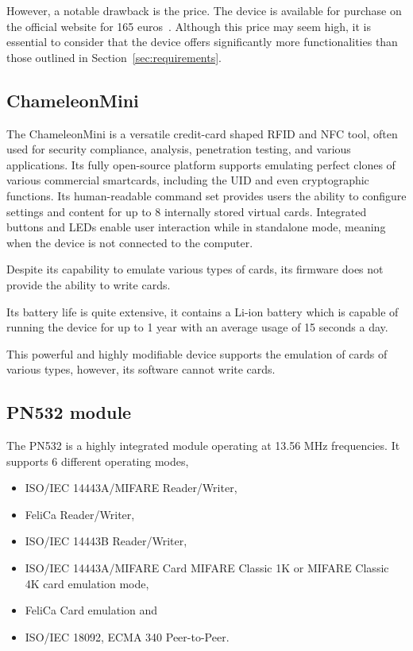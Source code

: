 However, a notable drawback is the price. The device is available for purchase on the official website for 165 euros~\cite{flippershop}. Although this price may seem high, it is essential to consider that the device offers significantly more functionalities than those outlined in Section~\ref{sec:requirements}.


\subsection{ChameleonMini}

The ChameleonMini is a versatile credit-card shaped RFID and NFC tool, often used for security compliance, analysis, penetration testing, and various applications. Its fully open-source platform supports emulating perfect clones of various commercial smartcards, including the UID and even cryptographic functions. Its human-readable command set provides users the ability to configure settings and content for up to 8 internally stored virtual cards. Integrated buttons and LEDs enable user interaction while in standalone mode, meaning when the device is not connected to the computer.~\cite{chameleonwiki}

Despite its capability to emulate various types of cards, its firmware does not provide the ability to write cards.~\cite{lab401chameleon}

Its battery life is quite extensive, it contains a Li-ion battery which is capable of running the device for up to 1 year with an average usage of 15 seconds a day.~\cite{lab401chameleon}

This powerful and highly modifiable device supports the emulation of cards of various types, however, its software cannot write cards.


\subsection{PN532 module}

The PN532 is a highly integrated module operating at 13.56 MHz frequencies. It supports 6 different operating modes,
\begin{itemize}
    \item ISO/IEC 14443A/MIFARE Reader/Writer,
    \item FeliCa Reader/Writer,
    \item ISO/IEC 14443B Reader/Writer,
    \item ISO/IEC 14443A/MIFARE Card MIFARE Classic 1K or MIFARE Classic 4K card emulation mode,
    \item FeliCa Card emulation and
    \item ISO/IEC 18092, ECMA 340 Peer-to-Peer.~\cite{pn532doc}
\end{itemize}

